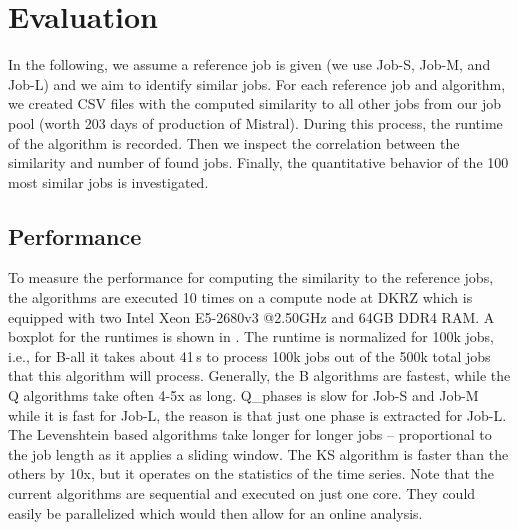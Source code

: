 \documentclass{jhps}
\begin{document}



\section{Evaluation}%
\label{sec:evaluation}

In the following, we assume a reference job is given (we use Job-S, Job-M, and Job-L) and we aim to identify similar jobs.
For each reference job and algorithm, we created CSV files with the computed similarity to all other jobs from our job pool (worth 203 days of production of Mistral).
During this process, the runtime of the algorithm is recorded.
Then we inspect the correlation between the similarity and number of found jobs.
Finally, the quantitative behavior of the 100 most similar jobs is investigated.



\subsection{Performance}

To measure the performance for computing the similarity to the reference jobs, the algorithms are executed 10 times on a compute node at DKRZ which is equipped with two Intel Xeon E5-2680v3 @2.50GHz and 64GB DDR4 RAM.
A boxplot for the runtimes is shown in .
The runtime is normalized for 100k jobs, i.e., for B-all it takes about 41\,s to process 100k jobs out of the 500k total jobs that this algorithm will process.
Generally, the B algorithms are fastest, while the Q algorithms take often 4-5x as long.
Q\_phases is slow for Job-S and Job-M while it is fast for Job-L, the reason is that just one phase is extracted for Job-L.
The Levenshtein based algorithms take longer for longer jobs -- proportional to the job length as it applies a sliding window.
The KS algorithm is faster than the others by 10x, but it operates on the statistics of the time series.
Note that the current algorithms are sequential and executed on just one core.
They could easily be parallelized which would then allow for an online analysis.
\end{document}
